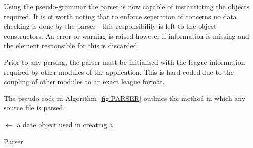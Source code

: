 Using the pseudo-grammar the parser is now capable of instantiating
the objects required. It is of worth noting that to enforce seperation
of concerns no data checking is done by the parser - this
responsibility is left to the object constructors. An error or warning
is raised however if information is missing and the element
responsible for this is discarded.

Prior to any parsing, the parser must be initialised with the league
information required by other modules of the application. This is hard
coded due to the coupling of other modules to an exact league format.

The pseudo-code in Algorithm~\ref{fig:PARSER} outlines the method in
which any source file is parsed.

\IncMargin{2em}
\begin{algorithm}
  \SetAlgoLined
   
   
   

  \Date $\leftarrow$ a date object used in creating a \Match\;
    \caption{Parser}\label{fig:PARSER}
\end{algorithm}
\DecMargin{2em}


\clearpage
